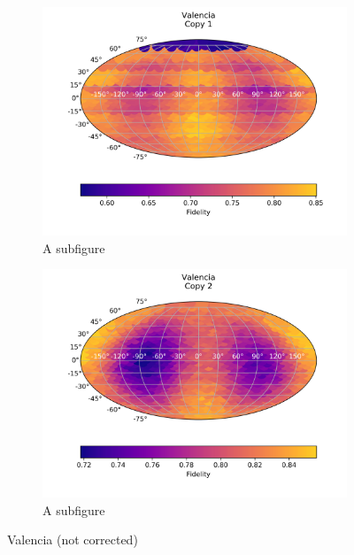 \begin{figure}[H]
    \centering
    \begin{subfigure}{.5\textwidth}
      \centering
      \includegraphics[width=\textwidth]{Figures/PhaseCovariant/IBM/FullSphere/results_valencia.txt_copy1.png}
      \caption{A subfigure}
      \label{fig:pc_valencia_sphere_1}
    \end{subfigure}%
    \begin{subfigure}{.5\textwidth}
      \centering
      \includegraphics[width=\textwidth]{Figures/PhaseCovariant/IBM/FullSphere/results_valencia.txt_copy2.png}
      \caption{A subfigure}
      \label{fig:pc_valencia_sphere_2}
    \end{subfigure}
    \caption{Valencia (not corrected)}
    \label{fig:pc_valencia_sphere}
\end{figure}

